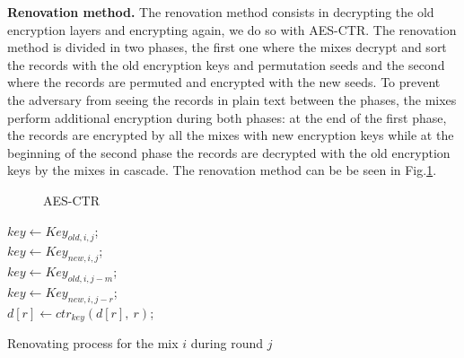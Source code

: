 \documentclass[USenglish,oneside,twocolumn]{article}
\begin{document}
\noindent\textbf{Renovation method.} The renovation method consists in decrypting the old encryption layers and encrypting again, we do so with AES-CTR. 
The renovation method is divided in two phases, the first one where the mixes decrypt and sort the records with the old encryption keys and permutation seeds and the second where the records are permuted and encrypted with the new seeds.
To prevent the adversary from seeing the records in plain text between the phases, the mixes perform additional encryption during both phases: at the end of the first phase, the records are encrypted by all the mixes with new encryption keys while at the beginning of the second phase the records are decrypted with the old encryption keys by the mixes in cascade.
The renovation method can be be seen in Fig.\ref{fig:AES}.  

\begin{figure}
\begin{minipage}{0.475\textwidth}
\begin{adjustbox}{width=\textwidth}
\end{adjustbox}
\centering
\caption{AES-CTR} \label{fig:AES}
\end{minipage}
\end{figure}

\begin{algorithm}
\DontPrintSemicolon
{}
$key \gets Key_{old,i,j}$;\\
{
	$key \gets Key_{new,i,j}$;\\
}
{
	$key \gets Key_{old,i,j-m}$;\\
}
\uElse
{
	$key \gets Key_{new,i,j-r}$;\\
}
{
	$d[r] \gets ctr_{key}\left (d[r],\ r\right )$;\\
}
\caption{Renovating process for the mix $i$ during round $j$}
\label{alg:renov}
\end{algorithm}
\end{document}

